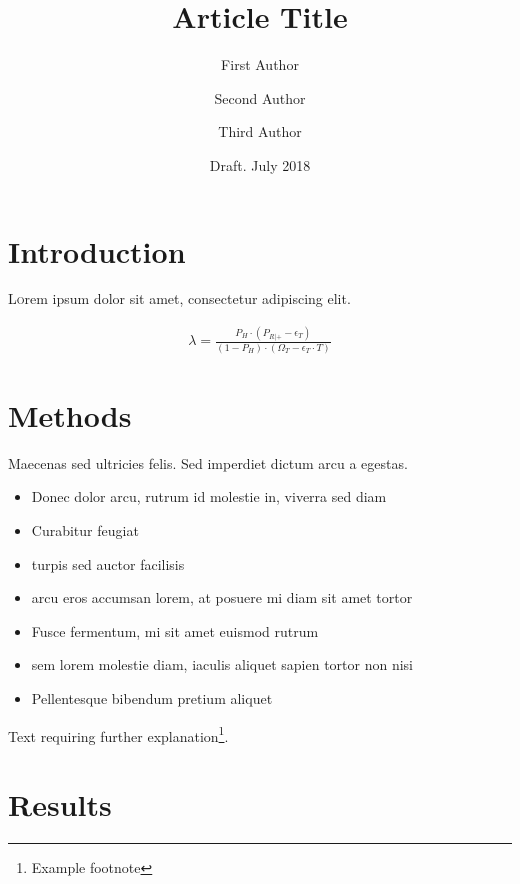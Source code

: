 \documentclass[a4paper,10pt,british]{article} %
\title{Article Title} %
\author[1†]{First Author}
\author[2†*]{Second Author}
\author[3]{Third Author}
\affil[1]{First Affiliation}
\affil[2]{Second Affiliation}
\affil[3]{Third Affiliation}
\affil[†]{These authors contributed equally.}
\affil[*]{\href{mailto:eduardgrebe@sun.ac.za}{eduardgrebe@sun.ac.za}}
\date{Draft. July 2018} %
\begin{document}
\maketitle


\section{Introduction}

\lettrine[nindent=0em,lines=3]{L} orem ipsum dolor sit amet, consectetur adipiscing elit.
\blindtext %

\begin{eqnarray}
\label{eq:kassanjee}
\lambda = \frac{P_H \cdot (P_{R|+}-\epsilon_T)}{(1 - P_H) \cdot (\Omega_T - \epsilon_T \cdot T)}
\end{eqnarray}

\blindtext %


\section{Methods}

Maecenas sed ultricies felis. Sed imperdiet dictum arcu a egestas.
\begin{itemize}
\item Donec dolor arcu, rutrum id molestie in, viverra sed diam
\item Curabitur feugiat
\item turpis sed auctor facilisis
\item arcu eros accumsan lorem, at posuere mi diam sit amet tortor
\item Fusce fermentum, mi sit amet euismod rutrum
\item sem lorem molestie diam, iaculis aliquet sapien tortor non nisi
\item Pellentesque bibendum pretium aliquet
\end{itemize}
\blindtext %

Text requiring further explanation\footnote{Example footnote}.


\section{Results}
\end{document}
